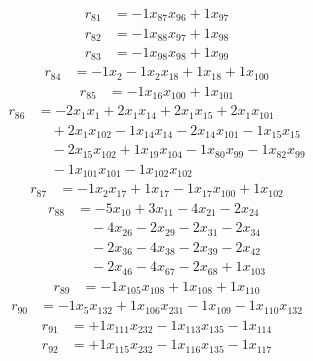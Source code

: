\[\begin{aligned}
r_{81} &= - 1 x_{87} x_{96} + 1 x_{97}
\end{aligned}\]
\[\begin{aligned}
r_{82} &= - 1 x_{88} x_{97} + 1 x_{98}
\end{aligned}\]
\[\begin{aligned}
r_{83} &= - 1 x_{98} x_{98} + 1 x_{99}
\end{aligned}\]
\[\begin{aligned}
r_{84} &= - 1 x_{2} - 1 x_{2} x_{18} + 1 x_{18} + 1 x_{100}
\end{aligned}\]
\[\begin{aligned}
r_{85} &= - 1 x_{16} x_{100} + 1 x_{101}
\end{aligned}\]
\[\begin{aligned}
r_{86} &= - 2 x_{1} x_{1} + 2 x_{1} x_{14} + 2 x_{1} x_{15} + 2 x_{1} x_{101} \\
 &\quad + 2 x_{1} x_{102} - 1 x_{14} x_{14} - 2 x_{14} x_{101} - 1 x_{15} x_{15} \\
 &\quad - 2 x_{15} x_{102} + 1 x_{19} x_{104} - 1 x_{80} x_{99} - 1 x_{82} x_{99} \\
 &\quad - 1 x_{101} x_{101} - 1 x_{102} x_{102}
\end{aligned}\]
\[\begin{aligned}
r_{87} &= - 1 x_{2} x_{17} + 1 x_{17} - 1 x_{17} x_{100} + 1 x_{102}
\end{aligned}\]
\[\begin{aligned}
r_{88} &= - 5 x_{10} + 3 x_{11} - 4 x_{21} - 2 x_{24} \\
 &\quad - 4 x_{26} - 2 x_{29} - 2 x_{31} - 2 x_{34} \\
 &\quad - 2 x_{36} - 4 x_{38} - 2 x_{39} - 2 x_{42} \\
 &\quad - 2 x_{46} - 4 x_{67} - 2 x_{68} + 1 x_{103}
\end{aligned}\]
\[\begin{aligned}
r_{89} &= - 1 x_{105} x_{108} + 1 x_{108} + 1 x_{110}
\end{aligned}\]
\[\begin{aligned}
r_{90} &= - 1 x_{5} x_{132} + 1 x_{106} x_{231} - 1 x_{109} - 1 x_{110} x_{132}
\end{aligned}\]
\[\begin{aligned}
r_{91} &= + 1 x_{111} x_{232} - 1 x_{113} x_{135} - 1 x_{114}
\end{aligned}\]
\[\begin{aligned}
r_{92} &= + 1 x_{115} x_{232} - 1 x_{116} x_{135} - 1 x_{117}
\end{aligned}\]
